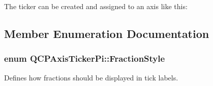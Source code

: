 The ticker can be created and assigned to an axis like this\+: 
\begin{DoxyCodeInclude}
\end{DoxyCodeInclude}


\subsection{Member Enumeration Documentation}
\subsubsection[{\texorpdfstring{Fraction\+Style}{FractionStyle}}]{\setlength{\rightskip}{0pt plus 5cm}enum {\bf Q\+C\+P\+Axis\+Ticker\+Pi\+::\+Fraction\+Style}}\hypertarget{classQCPAxisTickerPi_a262f1534c7f0c79a7d5237f5d1e2c54c}{}\label{classQCPAxisTickerPi_a262f1534c7f0c79a7d5237f5d1e2c54c}
Defines how fractions should be displayed in tick labels.

